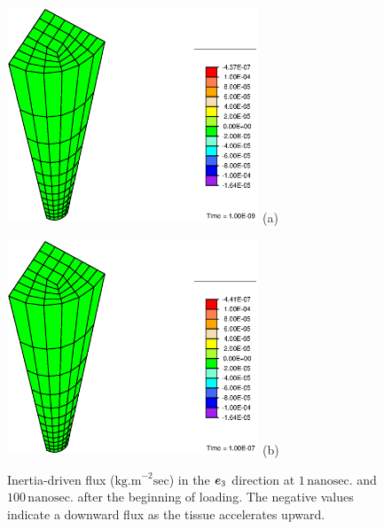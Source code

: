 \begin{figure}[ht]
\begin{minipage}[t]{7.5cm}
{\includegraphics[width=7.5cm]{images/M4-1.eps}} \hskip 3cm (a)
\end{minipage}
\begin{minipage}[t]{7.5cm}
{\includegraphics[width=7.5cm]{images/M4-100.eps}} \hskip 3cm (b)
\end{minipage}
\caption{Inertia-driven flux ($\mathrm{kg.m}^{-2}\mathrm{sec}$) in
the $\mbox{\boldmath$ e$}_3$ direction at $1 \,\mathrm{nanosec.}$ and
$100\,\mathrm{nanosec.}$ after the beginning of loading. The
negative values indicate a downward flux as the tissue accelerates
upward.} \label{M4fig}
\end{figure}

